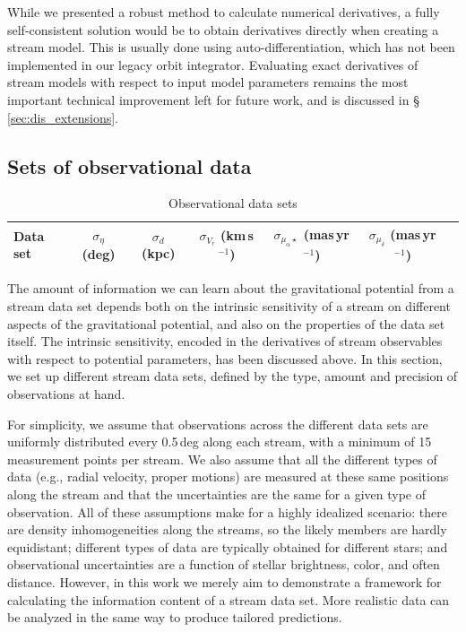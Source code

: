 \documentclass[modern]{aastex61}
\begin{document}
While we presented a robust method to calculate numerical derivatives, a fully self-consistent solution would be to obtain derivatives directly when creating a stream model.
This is usually done using auto-differentiation, which has not been implemented in our legacy orbit integrator.
Evaluating exact derivatives of stream models with respect to input model parameters remains the most important technical improvement left for future work, and is discussed in \S\,\ref{sec:dis_extensions}.


\subsection{Sets of observational data}
\label{sec:datasets}

\begin{table}
\begin{center}
\begin{tabular}{l c c c c c c}
\hline
\hline
Data set & $\sigma_\eta$ (deg) & $\sigma_d$ (kpc) & $\sigma_{V_r}$ (km\,s$^{-1}$) & $\sigma_{\mu_\alpha\star}$ (mas\,yr$^{-1}$) & $\sigma_{\mu_\delta}$ (mas\,yr$^{-1}$) \\
\hline

\hline
\hline
\end{tabular}
\caption{Observational data sets}
\label{t:datasets}
\end{center}
\end{table}

The amount of information we can learn about the gravitational potential from a stream data set depends both on the intrinsic sensitivity of a stream on different aspects of the gravitational potential, and also on the properties of the data set itself.
The intrinsic sensitivity, encoded in the derivatives of stream observables with respect to potential parameters, has been discussed above.
In this section, we set up different stream data sets, defined by the type, amount and precision of observations at hand.

For simplicity, we assume that observations across the different data sets are uniformly distributed every 0.5\,deg along each stream, with a minimum of 15 measurement points per stream.
We also assume that all the different types of data (e.g., radial velocity, proper motions) are measured at these same positions along the stream and that the uncertainties are the same for a given type of observation.
All of these assumptions make for a highly idealized scenario: there are density inhomogeneities along the streams, so the likely members are hardly equidistant; different types of data are typically obtained for different stars; and observational uncertainties are a function of stellar brightness, color, and often distance.
However, in this work we merely aim to demonstrate a framework for calculating the information content of a stream data set.
More realistic data can be analyzed in the same way to produce tailored predictions.
\end{document}

